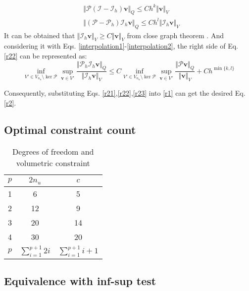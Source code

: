\begin{pf}
\begin{align}
    &\Vert \mathcal P(\mathcal I - \mathcal I_h) \boldsymbol v \Vert_Q \le C h^k \Vert \boldsymbol v \Vert_V \\
    &\Vert(\mathcal P - \mathcal P_h)\mathcal I_h \boldsymbol v \Vert_Q \le Ch^l \Vert \mathcal I_h \boldsymbol v \Vert_V
\label{interpolation2}
\end{align}
    It can be obtained that $\Vert \mathcal I_h \boldsymbol v\Vert_V \ge C\Vert \boldsymbol v \Vert_V$ from close graph theorem \cite{quarteroni1994}. And considering it with Eqs. \eqref{interpolation1}-\eqref{interpolation2}, the right side of Eq. \eqref{r22} can be represented as:
\begin{equation}\label{r23}
\inf_{V'\in V_{n_u}\setminus \ker \mathcal P} \sup_{\boldsymbol v \in V'} \frac{\Vert \mathcal P_h\mathcal I_h\boldsymbol v\Vert_Q}{\Vert \mathcal I_h \boldsymbol v\Vert_V} \le
    C \inf_{V'\in V_{n_u}\setminus \ker \mathcal P} \sup_{\boldsymbol v \in V'} \frac{\Vert \mathcal P\boldsymbol v\Vert_Q}{\Vert \boldsymbol v\Vert_V} + Ch^{\min\{k,l\}}
\end{equation}

    Consequently, substituting Eqs. \eqref{r21},\eqref{r22},\eqref{r23} into \eqref{r1} can get the desired Eq. \eqref{r2}.
\end{pf}

\subsection{Optimal constraint count}
\begin{table}[ht!]
\centering
\caption{Degrees of freedom and volumetric constraint}
\begin{tabular}{ccc}
\toprule
$p$ & $2n_u$ & $c$ \\
\midrule
1 & 6 & 5 \\
2 & 12 & 9 \\
3 & 20 & 14 \\
4 & 30 & 20 \\
$p$ & $\sum_{i=1}^{p+1}2i$ & $\sum_{i=1}^{p+1}i+1$ \\
\bottomrule
\end{tabular}
\end{table}
\subsection{Equivalence with inf-sup test}
